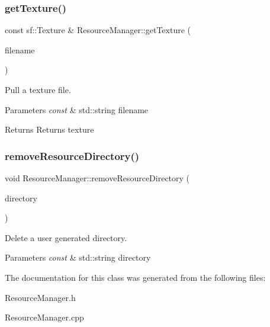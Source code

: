 \subsubsection{\texorpdfstring{get\+Texture()}{getTexture()}}
{\footnotesize\ttfamily const sf\+::\+Texture \& Resource\+Manager\+::get\+Texture (\begin{DoxyParamCaption}\item[{const std\+::string \&}]{filename }\end{DoxyParamCaption})}



Pull a texture file. 


\begin{DoxyParams}{Parameters}
{\em const} & std\+::string filename \\
\hline
\end{DoxyParams}
\begin{DoxyReturn}{Returns}
Returns texture 
\end{DoxyReturn}
\mbox{\label{class_resource_manager_a38fde2e7c5145472f504a6abb06d7a23}} 
\subsubsection{\texorpdfstring{remove\+Resource\+Directory()}{removeResourceDirectory()}}
{\footnotesize\ttfamily void Resource\+Manager\+::remove\+Resource\+Directory (\begin{DoxyParamCaption}\item[{const std\+::string \&}]{directory }\end{DoxyParamCaption})}



Delete a user generated directory. 


\begin{DoxyParams}{Parameters}
{\em const} & std\+::string directory \\
\hline
\end{DoxyParams}


The documentation for this class was generated from the following files\+:\begin{DoxyCompactItemize}
\item 
Resource\+Manager.\+h\item 
Resource\+Manager.\+cpp\end{DoxyCompactItemize}

